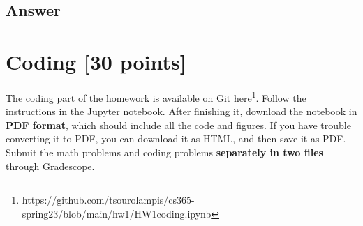  \subsection{Answer}
 



  \section{Coding [30 points]}

  The coding part of the homework is available on Git \href{https://github.com/tsourolampis/cs365-spring23/tree/main/hw1}{here}\footnote{https://github.com/tsourolampis/cs365-spring23/blob/main/hw1/HW1coding.ipynb}. Follow the instructions in the Jupyter notebook. After finishing it, download the notebook in \textbf{PDF format}, which should include all the code and figures. If you have trouble converting it to PDF, you can download it as HTML, and then save it as PDF. Submit the math problems and coding problems \textbf{separately in two files} through Gradescope.

